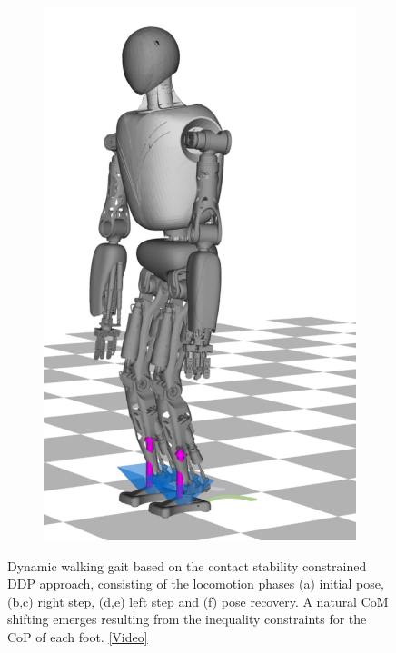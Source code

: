 \begin{figure}
\begin{subfigure}{.16\textwidth}
	\includegraphics[width=.95\linewidth]{fig/walkDynamic/snaps/8}
	\caption{}
\end{subfigure}
\caption[Dynamic walking based on the contact stability constrained \gls{DDP}]{Dynamic walking gait based on the contact stability constrained \gls{DDP} approach, consisting of the locomotion phases (a) initial pose, (b,c) right step, (d,e) left step and (f) pose recovery. A natural \gls{CoM} shifting emerges resulting from the inequality constraints for the \gls{CoP} of each foot. \href{https://github.com/julesser/ma-thesis-simulation-results/blob/master/DynamicWalking_LargeSteps_CoP100_ArmsFreed/crocoddyl.mp4}{[Video]}}
\label{fig:walkDynamic_Snaps}
\end{figure}

